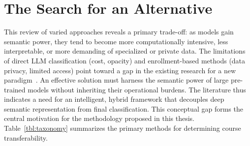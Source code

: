 \section{The Search for an Alternative}
This review of varied approaches reveals a primary trade-off: as models gain semantic power, they tend to become more computationally intensive, less interpretable, or more demanding of specialized or private data.  The limitations of direct LLM classification (cost, opacity) and enrollment-based methods (data privacy, limited access) point toward a gap in the existing research for a new paradigm~\cite{pardos10.1145/3330430.3333622}.
An effective solution must harness the semantic power of large pre-trained models without inheriting their operational burdens.  The literature thus indicates a need for an intelligent, hybrid framework that decouples deep semantic representation from final classification.  This conceptual gap forms the central motivation for the methodology proposed in this thesis.  Table~\ref{tbl:taxonomy} summarizes the primary methods for determining course transferability.

